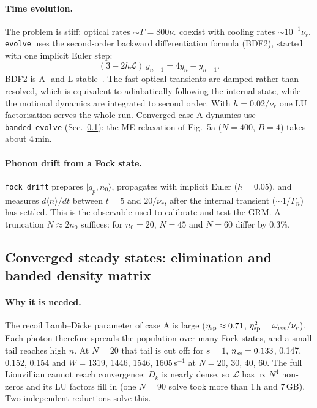 \documentclass[11pt,a4paper]{article}
\newcommand{\ket}[1]{|#1\rangle}
\newcommand{\code}[1]{\texttt{#1}}
\begin{document}
\paragraph{Time evolution.} The problem is stiff: optical rates $\sim\Gamma=800\nu_r$ coexist with cooling rates $\sim10^{-1}\nu_r$. \code{evolve} uses the second-order backward differentiation formula (BDF2), started with one implicit Euler step:
\begin{equation}
  (3-2h\mathcal L)\,y_{n+1}=4y_n-y_{n-1}.
\end{equation}
BDF2 is A- and L-stable~\cite{hairer1996}. The fast optical transients are damped rather than resolved, which is equivalent to adiabatically following the internal state, while the motional dynamics are integrated to second order. With $h=0.02/\nu_r$ one LU factorisation serves the whole run. Converged case-A dynamics use \code{banded\_evolve} (Sec.~\ref{sec:banded}): the ME relaxation of Fig.~5a ($N=400$, $B=4$) takes about 4\,min.

\paragraph{Phonon drift from a Fock state.} \code{fock\_drift} prepares $\ket{g_p,n_0}$, propagates with implicit Euler ($h=0.05$), and measures $d\langle n\rangle/dt$ between $t=5$ and $20/\nu_r$, after the internal transient ($\sim1/\Gamma_n$) has settled. This is the observable used to calibrate and test the GRM. A truncation $N\approx2n_0$ suffices: for $n_0=20$, $N=45$ and $N=60$ differ by 0.3\%.

\subsection{Converged steady states: elimination and banded density matrix}
\label{sec:banded}
\paragraph{Why it is needed.} The recoil Lamb--Dicke parameter of case A is large ($\eta_{\rm sp}\approx0.71$, $\eta_{\rm sp}^2=\omega_{\rm rec}/\nu_r$). Each photon therefore spreads the population over many Fock states, and a small tail reaches high $n$. At $N=20$ that tail is cut off: for $s=1$, $n_{\rm ss}=0.133$, 0.147, 0.152, 0.154 and $W=1319$, 1446, 1546, 1605\,s$^{-1}$ at $N=20$, 30, 40, 60. The full Liouvillian cannot reach convergence: $D_k$ is nearly dense, so $\mathcal L$ has $\propto N^4$ non-zeros and its LU factors fill in (one $N=90$ solve took more than 1\,h and 7\,GB). Two independent reductions solve this.
\end{document}
